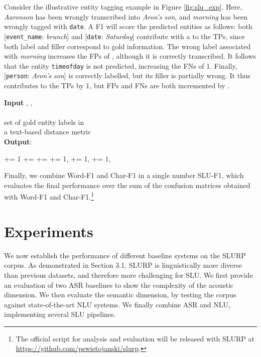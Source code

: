 \documentclass[11pt,a4paper]{article}
\newcommand{\metricname}{SLU-F1}
\newcommand{\werm}{Word-F1}
\newcommand{\levm}{Char-F1}
\newcommand{\datasetacr}{SLURP}
\newcommand{\slu}{SLU}
\newcommand{\asr}{ASR}
\newcommand{\nlu}{NLU}
\newcommand{\tp}{TPs}
\newcommand{\fp}{FPs}
\newcommand{\fn}{FNs}
\begin{document}
Consider the illustrative entity tagging example in Figure \ref{fig:slu_exp}. 
Here, \textit{Aaronson} has been wrongly transcribed into \textit{Aron's son}, and \textit{morning} has been wrongly tagged with \texttt{date}. A F1 will score the predicted entities as follows:
both [\texttt{event\_name}: \textit{brunch}] and [\texttt{date}: \textit{Saturday}] contribute with a  to the \tp{}, since both label and filler correspond to gold information. The wrong label associated with \textit{morning} increases the \fp{} of , although it is correctly transcribed. It follows that the entity \texttt{timeofday} is not predicted, increasing the \fn{} of 1. Finally, [\texttt{person}: \textit{Aron's son}] is correctly labelled, but its filler is partially wrong. It thus contributes to the \tp{} by 1, but \fp{} and \fn{} are both incremented by . 
\begin{algorithm}
    \footnotesize
	\caption{-F1 for a sentence }
\textbf{Input} , ,\\
    \hspace*{\algorithmicindent} \hspace{0.2cm}  \\
    \hspace*{\algorithmicindent} \hspace{0.2cm}  set of gold entity labels in \\
    \hspace*{\algorithmicindent} \hspace{0.2cm}  a text-based distance metric\\
    \textbf{Output}: 
	\begin{algorithmic}[1]
		    \If {}
		        \State  
		        \If {}
		            \State 
		            \State  += 1
		            \State  += 
		            \State  += 
		            \State 
		        \Else
		            \State  += 1, 
		        \EndIf
		   \Else
		        \State  += 1, 
		   \EndIf
		\EndFor
		\For {}
		    \State  += 1, 
		\EndFor
	\end{algorithmic} 
	\label{lst:werf1} 
\end{algorithm}

Finally, we combine \werm{} and \levm{} in a single number
\metricname, which evaluates the final performance over the sum of the confusion matrices obtained with \werm{} and \levm.\footnote{The official script for analysis and evaluation will be released with SLURP at \url{https://github.com/pswietojanski/slurp}.} 

\section{Experiments}
\label{sec:results}
We now establish the performance of different baseline systems on the \datasetacr{} corpus. As demonstrated in Section 3.1, \datasetacr{} is  linguistically more diverse than previous datasets, and therefore more challenging for \slu.
We first provide an evaluation of two \asr{} baselines to show the complexity of the acoustic dimension.
We then evaluate the semantic dimension, by testing the corpus against state-of-the-art \nlu{} systems.
We finally combine \asr{} and \nlu, implementing several \slu{} pipelines.
\end{document}
